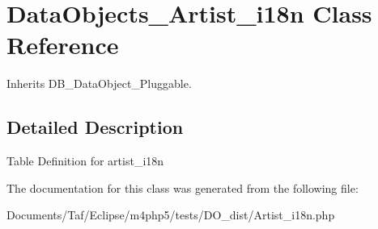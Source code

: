 \hypertarget{classDataObjects__Artist__i18n}{
\section{DataObjects\_\-Artist\_\-i18n Class Reference}
\label{classDataObjects__Artist__i18n}
}
Inherits DB\_\-DataObject\_\-Pluggable.



\subsection{Detailed Description}
Table Definition for artist\_\-i18n 

The documentation for this class was generated from the following file:\begin{CompactItemize}
\item 
Documents/Taf/Eclipse/m4php5/tests/DO\_\-dist/Artist\_\-i18n.php\end{CompactItemize}
